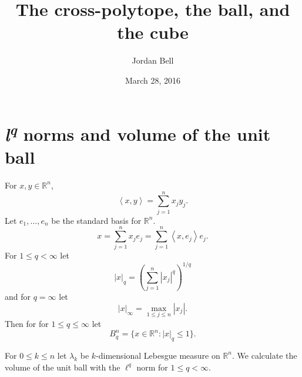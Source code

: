\documentclass{article}
\newcommand{\inner}[2]{\left\langle #1, #2 \right\rangle}
\theoremstyle{definition}
\begin{document}
\title{The cross-polytope, the ball, and the cube}
\author{Jordan Bell}
\date{March 28, 2016}

\maketitle

\section{{\em l\textsuperscript{q}} norms and volume of the unit ball}
For $x,y \in \mathbb{R}^n$,
\[
\inner{x}{y} = \sum_{j=1}^n x_j y_j.
\]
Let $e_1,\ldots,e_n$ be the standard basis for $\mathbb{R}^n$. 
\[
x = \sum_{j=1}^n x_j e_j = \sum_{j=1}^n \inner{x}{e_j} e_j.
\]
For $1 \leq q < \infty$ let
\[
|x|_q = \left( \sum_{j=1}^n |x_j|^q \right)^{1/q}
\]
and for $q=\infty$ let
\[
|x|_\infty = \max_{1 \leq j \leq n} |x_j|.
\]
Then for
for $1 \leq  q \leq \infty$ let
\[
B_q^n = \{x \in \mathbb{R}^n: |x|_q \leq 1\}.
\]

For $0 \leq k \leq n$ let $\lambda_k$ be $k$-dimensional Lebesgue measure on $\mathbb{R}^n$.
We calculate the volume of the unit ball with the $\ell^q$ norm for $1 \leq q<\infty$.
\end{document}
